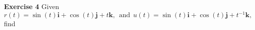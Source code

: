 \documentclass[12pt,oneside]{exam}
\newenvironment{exercise}[1]{\vspace{.1in}\noindent\textbf{Exercise #1 \hspace{.05em}}}{}
\begin{document}
\begin{exercise}{4}
Given 
\begin{equation*}
r(t) = \sin(t)\mathbf{i}+ \cos(t)\mathbf{j} + t\mathbf{k}, \ \ \mbox{and} \ \ u(t) = \sin(t)\mathbf{i} + \cos(t)\mathbf{j} + t^{-1}\mathbf{k},
\end{equation*}
find
\end{exercise}
\end{document}
